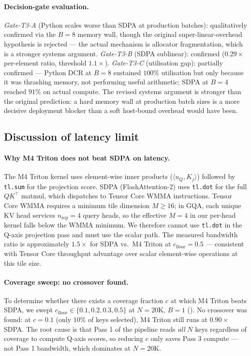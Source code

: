 \documentclass[11pt]{article}
\theoremstyle{definition}
\theoremstyle{remark}
\theoremstyle{plain}
\begin{document}
\paragraph{Decision-gate evaluation.}
\emph{Gate-T3-A} (Python scales worse than SDPA at production batches):
qualitatively confirmed via the $B\!=\!8$ memory wall, though the original
super-linear-overhead hypothesis is rejected --- the actual mechanism is
allocator fragmentation, which is a stronger systems argument.
\emph{Gate-T3-B} (SDPA sublinear): confirmed ($0.29\times$ per-element ratio,
threshold $1.1\times$).
\emph{Gate-T3-C} (utilisation gap): partially confirmed ---
Python DCR at $B\!=\!8$ sustained $100\%$ utilisation but only because it was
thrashing memory, not performing useful arithmetic; SDPA at $B\!=\!4$ reached
$91\%$ on actual compute. The revised systems argument is stronger than the
original prediction: a hard memory wall at production batch sizes is a more
decisive deployment blocker than a soft host-bound overhead would have been.

\subsection{Discussion of latency limit}\label{sec:latency_limit}

\paragraph{Why M4 Triton does not beat SDPA on latency.}
The M4 Triton kernel uses element-wise inner products ($\langle u_Q, K_j \rangle$)
followed by \texttt{tl.sum} for the projection score. SDPA (FlashAttention-2) uses
\texttt{tl.dot} for the full $QK^\top$ matmul, which dispatches to Tensor Core
WMMA instructions. Tensor Core WMMA requires a minimum tile dimension $M\!\geq\!16$;
in GQA, each unique KV head services $n_\text{rep}\!=\!4$ query heads, so the effective
$M\!=\!4$ in our per-head kernel falls below the WMMA minimum. We therefore cannot
use \texttt{tl.dot} in the Q-axis projection pass and must use the scalar path.
The measured bandwidth ratio is approximately $1.5\times$ for SDPA vs.\ M4 Triton
at $c_\text{floor}\!=\!0.5$ --- consistent with Tensor Core throughput advantage
over scalar element-wise operations at this tile size.

\paragraph{Coverage sweep: no crossover found.}
To determine whether there exists a coverage fraction $c$ at which M4 Triton beats
SDPA, we swept $c_\text{floor}\in\{0.1,0.2,0.3,0.5\}$ at $N\!=\!20\text{K}$,
$B\!=\!1$ (). No crossover was found: at $c\!=\!0.1$ (only
$10\%$ of keys selected), M4 Triton still runs at $0.90\times$ SDPA. The root
cause is that Pass 1 of the pipeline reads \emph{all} $N$ keys regardless of
coverage to compute Q-axis scores, so reducing $c$ only saves Pass 3 compute
--- not Pass 1 bandwidth, which dominates at $N\!=\!20\text{K}$.
\end{document}
